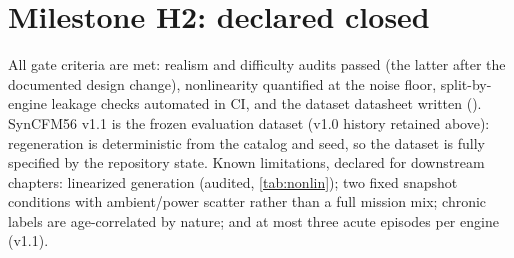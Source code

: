 \section{Milestone H2: declared closed}
\label{sec:h2}

All gate criteria are met: realism and difficulty audits passed (the latter after the
documented design change), nonlinearity quantified at the noise floor, split-by-engine
leakage checks automated in CI, and the dataset datasheet written
(). SynCFM56 v1.1 is the frozen evaluation dataset (v1.0 history retained above): regeneration is deterministic
from the catalog and seed, so the dataset is fully specified by the repository state. Known
limitations, declared for downstream chapters: linearized generation (audited,
\cref{tab:nonlin}); two fixed snapshot conditions with ambient/power scatter rather than a
full mission mix; chronic labels are age-correlated by nature; and at most three acute episodes per engine (v1.1).
